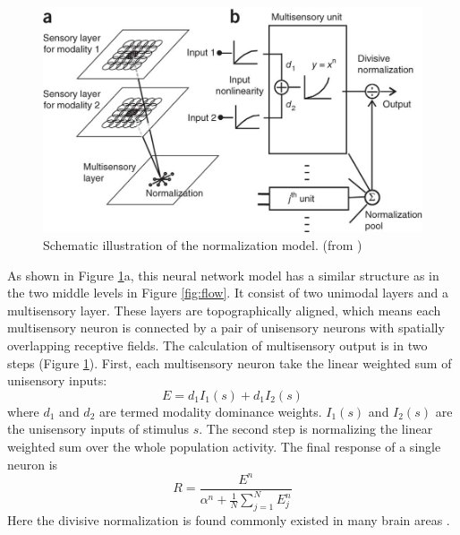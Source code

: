 \documentclass{article}[11pt]
\begin{document}
\begin{figure}[tpb]
  \centering
  \includegraphics[width=.8\textwidth]{normalize}
  \caption{Schematic illustration of the normalization model. (from \cite{ohshiro_normalization_2011})}
  \label{fig:normalize}
\end{figure}

As shown in Figure \ref{fig:normalize}a, this neural network model has a similar structure as in the two middle levels in Figure \ref{fig:flow}. It consist of two unimodal layers and a multisensory layer. These layers are topographically aligned, which means each multisensory neuron is connected by a pair of unisensory neurons with spatially overlapping receptive fields. The calculation of multisensory output is in two steps (Figure \ref{fig:normalize}). First, each multisensory neuron take the linear weighted sum of unisensory inputs:
\begin{equation}
  E = d_1 I_1(s) + d_1 I_2(s)
  \label{eq:step1}
\end{equation}
where $d_1$ and $d_2$ are termed modality dominance weights. $I_1(s)$ and $I_2(s)$ are the unisensory inputs of stimulus $s$. The second step is normalizing the linear weighted sum over the whole population activity. The final response of a single neuron is
\begin{equation}
  R = \frac{E^n}{\alpha^n+\frac{1}{N}\sum_{j=1}^N E_j^n}
  \label{eq:step2}
\end{equation}
Here the divisive normalization is found commonly existed in many brain areas \cite{carandini_normalization_2012}.
\end{document}
